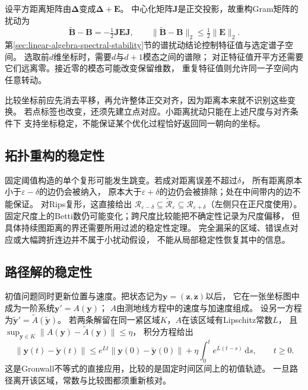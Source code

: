 设平方距离矩阵由$\bm\Delta$变成$\bm\Delta+\bm E$。
中心化矩阵$\bm J$是正交投影，故重构Gram矩阵的扰动为
\[
 \widetilde{\bm B}-\bm B=-\tfrac12\bm J\bm E\bm J,\qquad
 \lVert\widetilde{\bm B}-\bm B\rVert_2\leq\tfrac12\lVert\bm E\rVert_2.
\]
第\ref{sec:linear-algebra-spectral-stability}节的谱扰动结论控制特征值与选定谱子空间。
选取前$d$维坐标时，需要$d$与$d+1$模态之间的谱隙；
对正特征值开平方还需要它们远离零。接近零的模态可能改变保留维数，
重复特征值则允许同一子空间内任意转动。

比较坐标前应先消去平移，再允许整体正交对齐，因为距离本来就不识别这些变换。
若点标签也改变，还须先建立点对应。小距离扰动只能在上述尺度与对齐条件下
支持坐标稳定，不能保证某个优化过程恰好返回同一朝向的坐标。

\subsection{拓扑重构的稳定性}
\label{sec:geometry-topology-reconstruction-stability}

固定阈值构造的单个复形可能发生跳变。若成对距离误差不超过$\delta$，
所有距离原本小于$\varepsilon-\delta$的边仍会被纳入，
原本大于$\varepsilon+\delta$的边仍会被排除；处在中间带内的边不能保证。
对Rips复形，这直接给出
$\mathcal R_{\varepsilon-\delta}\subseteq\widetilde{\mathcal R}_{\varepsilon}
\subseteq\mathcal R_{\varepsilon+\delta}$（左侧只在正尺度使用）。
固定尺度上的Betti数仍可能变化；跨尺度比较能把不确定性记录为尺度偏移，
但具体持续图距离的界还需要所用过滤的稳定性定理。
完全漏采的区域、错误点对应或大幅跨折连边并不属于小扰动假设，
不能从局部稳定性恢复其中的信息。

\subsection{路径解的稳定性}
\label{sec:geometry-path-solution-stability}

初值问题同时更新位置与速度。把状态记为$\bm y=(\bm z,\dot{\bm z})$以后，
它在一张坐标图中成为一阶系统$\bm y'=A(\bm y)$；
$A$由测地线方程中的速度与加速度组成。
设另一方程为$\widetilde{\bm y}'=\widetilde A(\widetilde{\bm y})$。
若两条解留在同一紧区域$K$，$A$在该区域有Lipschitz常数$L$，
且$\sup_{\bm y\in K}\lVert A(\bm y)-\widetilde A(\bm y)\rVert\leq\eta$，
积分方程给出
\[
 \lVert \bm y(t)-\widetilde{\bm y}(t)\rVert
 \leq e^{Lt}\lVert \bm y(0)-\widetilde{\bm y}(0)\rVert
       +\eta\int_0^t e^{L(t-s)}\,\mathrm ds,\qquad t\geq0.
\]
这是Gronwall不等式的直接应用，比较的是固定时间区间上的初值轨迹。
一旦路径离开该区域，常数与比较图都须重新核对。

